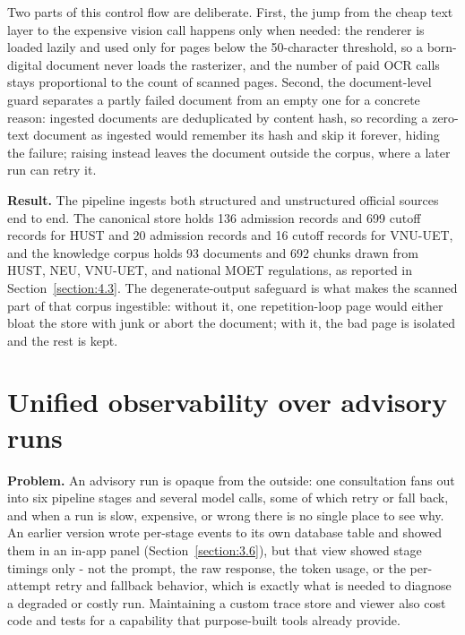 \documentclass[../main.tex]{subfiles}
\begin{document}
Two parts of this control flow are deliberate.
First, the jump from the cheap text layer to the expensive vision call happens only when needed: the renderer is loaded lazily and used only for pages below the 50-character threshold, so a born-digital document never loads the rasterizer, and the number of paid \gls{OCR} calls stays proportional to the count of scanned pages.
Second, the document-level guard separates a partly failed document from an empty one for a concrete reason: ingested documents are deduplicated by content hash, so recording a zero-text document as ingested would remember its hash and skip it forever, hiding the failure; raising instead leaves the document outside the corpus, where a later run can retry it.

\textbf{Result.}
The pipeline ingests both structured and unstructured official sources end to end.
The canonical store holds 136 admission records and 699 cutoff records for HUST and 20 admission records and 16 cutoff records for VNU-UET, and the knowledge corpus holds 93 documents and 692 chunks drawn from HUST, NEU, VNU-UET, and national \gls{MOET} regulations, as reported in Section~\ref{section:4.3}.
The degenerate-output safeguard is what makes the scanned part of that corpus ingestible: without it, one repetition-loop page would either bloat the store with junk or abort the document; with it, the bad page is isolated and the rest is kept.

\section{Unified observability over advisory runs}
\label{section:5.3}

\textbf{Problem.}
An advisory run is opaque from the outside: one consultation fans out into six pipeline stages and several model calls, some of which retry or fall back, and when a run is slow, expensive, or wrong there is no single place to see why.
An earlier version wrote per-stage events to its own database table and showed them in an in-app panel (Section~\ref{section:3.6}), but that view showed stage timings only - not the prompt, the raw response, the token usage, or the per-attempt retry and fallback behavior, which is exactly what is needed to diagnose a degraded or costly run.
Maintaining a custom trace store and viewer also cost code and tests for a capability that purpose-built tools already provide.
\end{document}

